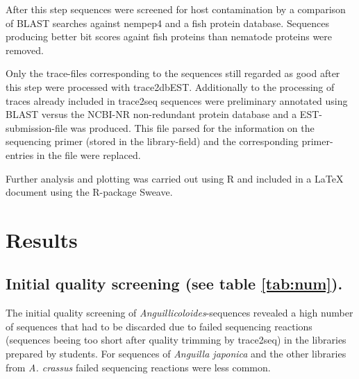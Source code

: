 \documentclass[12pt,a4paper]{article}
\begin{document}
After this step sequences were screened for host contamination by a
comparison of BLAST searches against nempep4 and a fish protein
database. Sequences producing better bit scores againt fish proteins
than nematode proteins were removed.

Only the trace-files corresponding to the sequences still regarded as
good after this step were processed with trace2dbEST. Additionally to
the processing of traces already included in trace2seq sequences were
preliminary annotated using BLAST versus the NCBI-NR non-redundant
protein database and a EST-submission-file was produced. This file
parsed for the information on the sequencing primer (stored in the
library-field) and the corresponding primer-entries in the file were
replaced.

Further analysis and plotting was carried out using R\cite{R_project}
and included in a {\LaTeX} document using the R-package
Sweave\cite{lmucs-papers:Leisch:2002}.

\section*{Results}

\subsection*{Initial quality screening (see table \ref{tab:num}).}

The initial quality screening of \textit{Anguillicoloides}-sequences
revealed a high number of sequences that had to be discarded due to
failed sequencing reactions (sequences beeing too short after quality
trimming by trace2seq) in the libraries prepared by students. For
sequences of \textit{Anguilla japonica} and the other libraries from
\textit{A. crassus} failed sequencing reactions were less common.
\end{document}
